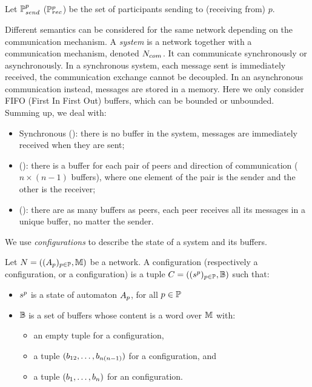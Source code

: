 \documentclass[submission,copyright,creativecommons,UKenglish]{eptcs}
\begin{document}
Let $\mathbb{P}_{send}^{p}$ (\resp $\mathbb{P}_{rec}^{p}$) be the set of participants sending to (\resp receiving from) $p$.

Different semantics can be considered for the same network depending on the communication mechanism. A \emph{system} is a network together with a communication mechanism, denoted $N_{{com}^{}}$.  
It can communicate synchronously or asynchronously. 
In a synchronous system, each message sent is immediately received, \ie the communication exchange cannot be decoupled.
In an asynchronous communication instead, messages are stored in a memory. Here we only consider FIFO (First In First Out) buffers, which can be bounded or unbounded. Summing up, we deal with: 

\begin{itemize}
\item Synchronous (\synch): there is no buffer in the system, messages are immediately received when they are sent; %

\item \Ptp (\pp): there is a buffer for each pair of peers and direction of communication ($n \times (n - 1)$ buffers), where
one element of the pair is the sender and the other is the receiver; 

\item \MAILBOX (\mailbox): there are as many buffers as peers, each peer receives all its messages in a unique buffer, no matter the sender. 
\end{itemize}

We use \emph{configurations} to describe the state of a system and its buffers. 
\begin{definition}[Configuration]\label{def:configuration} 
Let $N = \left( (A_{p})_{p \in \mathbb{P}}, \mathbb{M}\right)$ be a network.
  A \synch configuration (respectively a \pp configuration, or a \mailbox configuration)
          is a tuple $C = \left( ({s}_{}^{p})_{p \in \mathbb{P}}, \mathbb{B}\right)$ such that:
\begin{itemize}
\item ${s}_{}^{p} $ is a state of automaton $A_{p}$, for all $p\in \mathbb{P}$
\item $\mathbb{B}$ is a set of buffers whose content is a word over  $\mathbb{M}$ with:
\begin{itemize}
\item an empty tuple for a \synch configuration, 
\item  a tuple  $(b_{12},\dots,b_{n(n-1)})$ for a \pp configuration, and
\item  a tuple $(b_{1},\dots,b_{n})$ for an \mailbox configuration. 
\end{itemize} 
 \end{itemize}
\end{definition}
\end{document}
